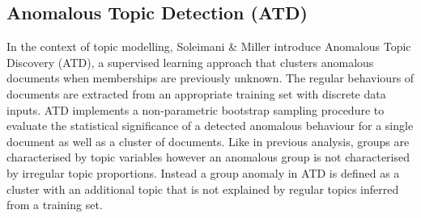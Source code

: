  

 
\subsection{Anomalous Topic Detection (ATD)} \label{Sec:ATD}
In the context of topic modelling,  Soleimani \& Miller \cite{ATD} introduce  Anomalous Topic Discovery (ATD), a supervised learning approach that clusters anomalous
documents when memberships are previously unknown. The regular behaviours of documents are extracted from an appropriate training set with discrete data inputs. ATD implements a non-parametric bootstrap sampling procedure to  evaluate the statistical significance of a detected anomalous behaviour for a single document as well as a cluster of documents.     
Like in previous analysis, groups are  characterised by topic variables however an anomalous group is not characterised by irregular topic proportions. Instead  a group anomaly in ATD  is defined as a cluster with an additional topic that is not explained by  regular topics inferred from a training set.   


